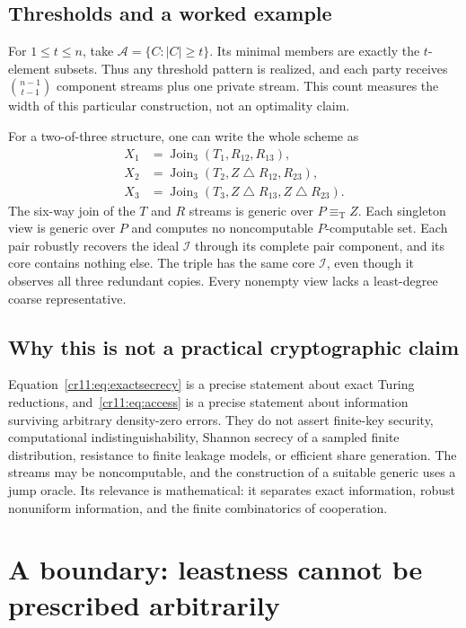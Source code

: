 \documentclass[11pt,letterpaper]{article}
\theoremstyle{plain}
\theoremstyle{definition}
\theoremstyle{remark}
\numberwithin{equation}{section}
\newcommand{\eqT}{\equiv_{\mathrm T}}
\newcommand{\bitsum}{\mathbin{\triangle}}
\newcommand{\I}{\mathcal I}
\newcommand{\Acal}{\mathcal A}
\begin{document}
\subsection{Thresholds and a worked example}

For $1\leq t\leq n$, take $\Acal=\{C:|C|\geq t\}$.
Its minimal members are exactly the $t$-element subsets. Thus any threshold
pattern is realized, and each party receives
$\binom{n-1}{t-1}$ component streams plus one private stream. This count
measures the width of this particular construction, not an optimality claim.

For a two-of-three structure, one can write the whole scheme as
\[
\begin{aligned}
 X_1&=\operatorname{Join}_3(T_1,R_{12},R_{13}),\\
 X_2&=\operatorname{Join}_3(T_2,Z\bitsum R_{12},R_{23}),\\
 X_3&=\operatorname{Join}_3(T_3,Z\bitsum R_{13},Z\bitsum R_{23}).
\end{aligned}
\]
The six-way join of the $T$ and $R$ streams is generic over $P\eqT Z$.
Each singleton view is generic over $P$ and computes no noncomputable
$P$-computable set. Each pair robustly recovers the ideal $\I$ through its
complete pair component, and its core contains nothing else. The triple has
the same core $\I$, even though it observes all three redundant copies.
Every nonempty view lacks a least-degree coarse representative.

\subsection{Why this is not a practical cryptographic claim}

Equation~\eqref{cr11:eq:exactsecrecy} is a precise statement about exact Turing
reductions, and~\eqref{cr11:eq:access} is a precise statement about information
surviving arbitrary density-zero errors. They do not assert finite-key
security, computational indistinguishability, Shannon secrecy of a sampled
finite distribution, resistance to finite leakage models, or efficient
share generation. The streams may be noncomputable, and the construction
of a suitable generic uses a jump oracle. Its relevance is mathematical:
it separates exact information, robust nonuniform information, and the
finite combinatorics of cooperation.

\section{A boundary: leastness cannot be prescribed arbitrarily}\label{cr11:sec:attainment}
\end{document}

